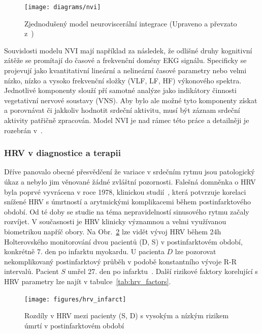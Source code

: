 \begin{figure}[H]
	\begin{center}
		\texttt{[image: diagrams/nvi]}
		\caption{Zjednodušený model neuroviscerální integrace (Upraveno a převzato z~\cite{NVI20017})}
		\label{fig:nvi_model}
	\end{center}
\end{figure}

Souvislosti modelu NVI mají například za následek, že odlišné druhy kognitivní
zátěže se promítají do časové a frekvenční domény EKG signálu. Specificky se
projevují jako kvantitativní lineární a nelineární časové parametry nebo velmi
nízko, nízko a vysoko frekvenční složky (VLF, LF, HF) výkonového spektra.
Jednotlivé komponenty slouží pří samotné analýze jako indikátory činnosti
vegetativní nervové soustavy (VNS). Aby bylo ale možné tyto komponenty získat a
porovnávat či jakkoliv hodnotit srdeční aktivitu, musí být záznam srdeční
aktivity patřičně zpracován. Model NVI je nad rámec této práce a detailněji je
rozebrán v~\cite{Smith2017}.

\subsubsection{HRV v diagnostice a terapii}
Dříve panovalo obecné přesvědčení že variace v srdečním rytmu jsou patologický
úkaz a nebylo jim věnované žádné zvláštní pozornosti. Falešná domněnka o HRV
byla poprvé vyvrácena v roce 1978, klinickou studií~\cite{Wolf1978}, která
potvrzuje korelaci snížené HRV s úmrtností a arytmickými komplikacemi během
postinfarktového období. Od té doby se studie na téma nepravidelností sinusového
rytmu začaly rozvíjet. V současnosti je HRV klinicky významnou a
velmi využívanou biometrikou napříč obory. Na Obr.~\ref{fig:hrv_infarct} lze
vidět vývoj HRV během 24h Holterovského monitorování dvou pacientů (D, S) v
postinfarktovém období, konkrétně 7. den po infarktu myokardu. U pacienta $D$
lze pozorovat nekomplikovaný postinfarktový průběh v podobě konstantního vývoje
R-R intervalů. Pacient $S$ umřel 27. den po infarktu~\cite{Malik1990}. Další
rizikové faktory korelující s HRV parametry lze najít v
tabulce~\ref{tab:hrv_factors}.

\begin{figure}[h]
	\begin{center}
		\texttt{[image: figures/hrv\_infarct]}
		\caption{Rozdíly v HRV mezi pacienty (S, D) s vysokým a nízkým rizikem úmrtí v
			postinfarktovém období \cite{Malik1990}}
		\label{fig:hrv_infarct}
	\end{center}
\end{figure}


